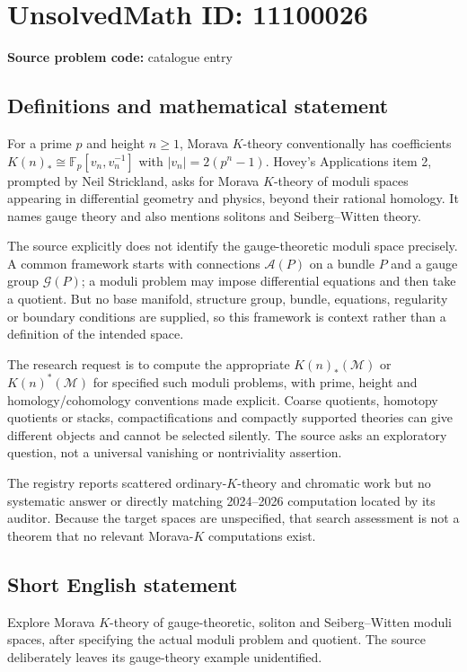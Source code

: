 \documentclass[11pt]{article}
\newcommand{\F}{\mathbb{F}}
\begin{document}
\section*{UnsolvedMath ID: 11100026}
\textbf{Source problem code:} catalogue entry
\subsection{Definitions and mathematical statement}
For a prime $p$ and height $n\geq1$, Morava $K$-theory conventionally has coefficients $K(n)_*\cong\F_p[v_n,v_n^{-1}]$ with $|v_n|=2(p^n-1)$. Hovey's Applications item 2, prompted by Neil Strickland, asks for Morava $K$-theory of moduli spaces appearing in differential geometry and physics, beyond their rational homology. It names gauge theory and also mentions solitons and Seiberg--Witten theory.

The source explicitly does not identify the gauge-theoretic moduli space precisely. A common framework starts with connections $\mathcal A(P)$ on a bundle $P$ and a gauge group $\mathcal G(P)$; a moduli problem may impose differential equations and then take a quotient. But no base manifold, structure group, bundle, equations, regularity or boundary conditions are supplied, so this framework is context rather than a definition of the intended space.

The research request is to compute the appropriate $K(n)_*(\mathcal M)$ or $K(n)^*(\mathcal M)$ for specified such moduli problems, with prime, height and homology/cohomology conventions made explicit. Coarse quotients, homotopy quotients or stacks, compactifications and compactly supported theories can give different objects and cannot be selected silently. The source asks an exploratory question, not a universal vanishing or nontriviality assertion.

The registry reports scattered ordinary-$K$-theory and chromatic work but no systematic answer or directly matching 2024--2026 computation located by its auditor. Because the target spaces are unspecified, that search assessment is not a theorem that no relevant Morava-$K$ computations exist.
\subsection{Short English statement}
Explore Morava $K$-theory of gauge-theoretic, soliton and Seiberg--Witten moduli spaces, after specifying the actual moduli problem and quotient. The source deliberately leaves its gauge-theory example unidentified.
\end{document}
